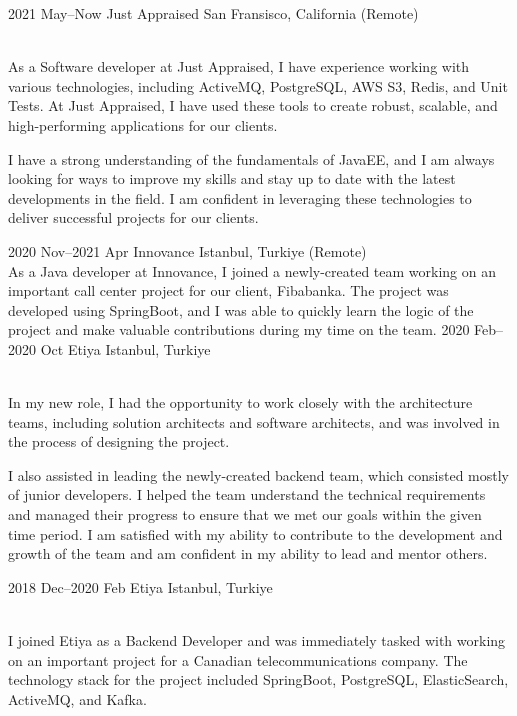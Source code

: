 \documentclass[]{cv-style}
\begin{document}
	\begin{entrylist}
		\entry
		{2021 May--Now}
		{Just Appraised}
		{San Fransisco, California (Remote)}
		{\\
		As a Software developer at Just Appraised, I have experience working with various technologies, including ActiveMQ, PostgreSQL, AWS S3, Redis, and Unit Tests. At Just Appraised, I have used these tools to create robust, scalable, and high-performing applications for our clients.

		I have a strong understanding of the fundamentals of JavaEE, and I am always looking for ways to improve my skills and stay up to date with the latest developments in the field. I am confident in leveraging these technologies to deliver successful projects for our clients.}
		\entry
		{2020 Nov--2021 Apr}
		{Innovance}
		{Istanbul, Turkiye (Remote)}
		{\\
		As a Java developer at Innovance, I joined a newly-created team working on an important call center project for our client, Fibabanka. The project was developed using SpringBoot, and I was able to quickly learn the logic of the project and make valuable contributions during my time on the team.
		}
		\entry
		{2020 Feb--2020 Oct}
		{Etiya}
		{Istanbul, Turkiye}
		{\\
		In my new role, I had the opportunity to work closely with the architecture teams, including solution architects and software architects, and was involved in the process of designing the project.

		I also assisted in leading the newly-created backend team, which consisted mostly of junior developers. I helped the team understand the technical requirements and managed their progress to ensure that we met our goals within the given time period. I am satisfied with my ability to contribute to the development and growth of the team and am confident in my ability to lead and mentor others.
		}
		\entry
		{2018 Dec--2020 Feb}
		{Etiya}
		{Istanbul, Turkiye}
		{\\
		I joined Etiya as a Backend Developer and was immediately tasked with working on an important project for a Canadian telecommunications company. The technology stack for the project included SpringBoot, PostgreSQL, ElasticSearch, ActiveMQ, and Kafka.

}
\end{entrylist}
\end{document}
